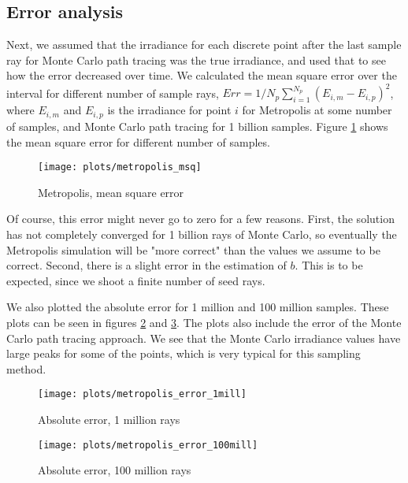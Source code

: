 \documentclass{article} %
\begin{document}
\subsection*{Error analysis}
Next, we assumed that the irradiance for each discrete point after the last sample ray for Monte Carlo path tracing was the true irradiance, and used that to see how the error decreased over time. We calculated the mean square error over the interval for different number of sample rays, $Err = 1/N_p \sum_{i=1}^{N_p} (E_{i,m} - E_{i,p})^2$, where $E_{i,m}$ and $E_{i,p}$ is the irradiance for point $i$ for Metropolis at some number of samples, and Monte Carlo path tracing for 1 billion samples. Figure \ref{fig:metropolis_msq} shows the mean square error for different number of samples.

\begin{figure}
    \centering
    \texttt{[image: plots/metropolis\_msq]}\\
    \caption{Metropolis, mean square error}
    \label{fig:metropolis_msq}
\end{figure}

Of course, this error might never go to zero for a few reasons. First, the solution has not completely converged for 1 billion rays of Monte Carlo, so eventually the Metropolis simulation will be "more correct" than the values we assume to be correct. Second, there is a slight error in the estimation of $b$. This is to be expected, since we shoot a finite number of seed rays.

We also plotted the absolute error for 1 million and 100 million samples. These plots can be seen in figures \ref{fig:metropolis_error1} and \ref{fig:metropolis_error100}. The plots also include the error of the Monte Carlo path tracing approach. We see that the Monte Carlo irradiance values have large peaks for some of the points, which is very typical for this sampling method.

\begin{figure}
    \centering
    \texttt{[image: plots/metropolis\_error\_1mill]}\\
    \caption{Absolute error, 1 million rays}
    \label{fig:metropolis_error1}
\end{figure}

\begin{figure}
    \centering
    \texttt{[image: plots/metropolis\_error\_100mill]}\\
    \caption{Absolute error, 100 million rays}
    \label{fig:metropolis_error100}
\end{figure}
\end{document}
